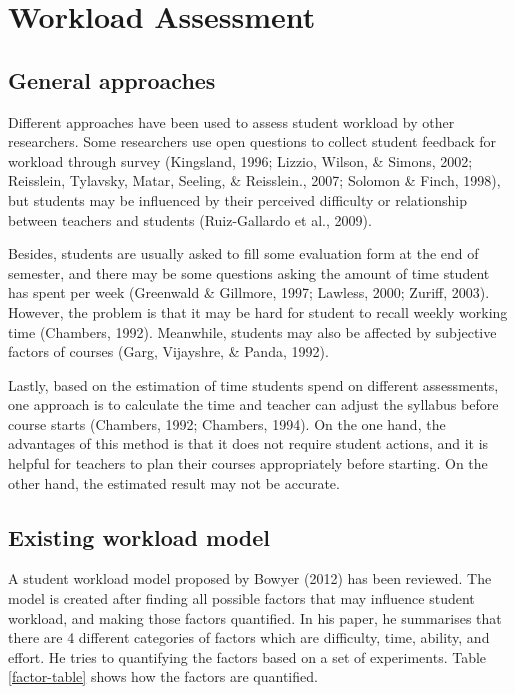 \documentclass[fyp]{socreport}
\begin{document}
\section{Workload Assessment}
\subsection{General approaches}
Different approaches have been used to assess student workload by other researchers. Some researchers use open questions to collect student feedback for workload through survey (Kingsland, 1996; Lizzio, Wilson, \& Simons, 2002; Reisslein, Tylavsky, Matar, Seeling, \& Reisslein., 2007; Solomon \& Finch, 1998), but students may be influenced by their perceived difficulty or relationship between teachers and students (Ruiz-Gallardo et al., 2009).

Besides, students are usually asked to fill some evaluation form at the end of semester, and there may be some questions asking the amount of time student has spent per week (Greenwald \& Gillmore, 1997; Lawless, 2000; Zuriff, 2003). However, the problem is that it may be hard for student to recall weekly working time (Chambers, 1992). Meanwhile, students may also be affected by subjective factors of courses (Garg, Vijayshre, \& Panda, 1992).

Lastly, based on the estimation of time students spend on different assessments, one approach is to calculate the time and teacher can adjust the syllabus before course starts (Chambers, 1992; Chambers, 1994). On the one hand, the advantages of this method is that it does not require student actions, and it is helpful for teachers to plan their courses appropriately before starting. On the other hand, the estimated result may not be accurate.

\subsection{Existing workload model}
A student workload model proposed by Bowyer (2012) has been reviewed. The model is created after finding all possible factors that may influence student workload, and making those factors quantified. In his paper, he summarises that there are 4 different categories of factors which are difficulty, time, ability, and effort. He tries to quantifying the factors based on a set of experiments. Table \ref{factor-table} shows how the factors are quantified.
\end{document}
